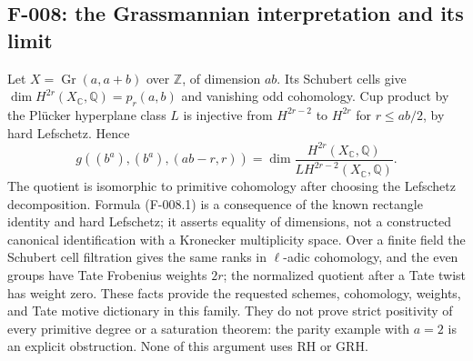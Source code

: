 \subsection{F-008: the Grassmannian interpretation and its limit}
Let $X=\operatorname{Gr}(a,a+b)$ over $\mathbb Z$, of dimension $ab$.
Its Schubert cells give
$\dim H^{2r}(X_{\mathbb C},\mathbb Q)=p_r(a,b)$ and vanishing odd cohomology.
Cup product by the Pl\"ucker hyperplane class $L$ is injective from
$H^{2r-2}$ to $H^{2r}$ for $r\leq ab/2$, by hard Lefschetz. Hence
\[
 g((b^a),(b^a),(ab-r,r))
 =\dim\frac{H^{2r}(X_{\mathbb C},\mathbb Q)}{L H^{2r-2}(X_{\mathbb C},\mathbb Q)}.
                                                            \tag{F-008.1}
\]
The quotient is isomorphic to primitive cohomology after choosing the
Lefschetz decomposition. Formula (F-008.1) is a consequence of the known
rectangle identity and hard Lefschetz; it asserts equality of dimensions,
not a constructed canonical identification with a Kronecker multiplicity
space. Over a finite field the Schubert cell filtration gives the same
ranks in $\ell$-adic cohomology, and the even groups have Tate Frobenius
weights $2r$; the normalized quotient after a Tate twist has weight zero.
These facts provide the requested schemes, cohomology, weights, and Tate
motive dictionary in this family. They do not prove strict positivity of
every primitive degree or a saturation theorem: the parity example with
$a=2$ is an explicit obstruction. None of this argument uses RH or GRH.

